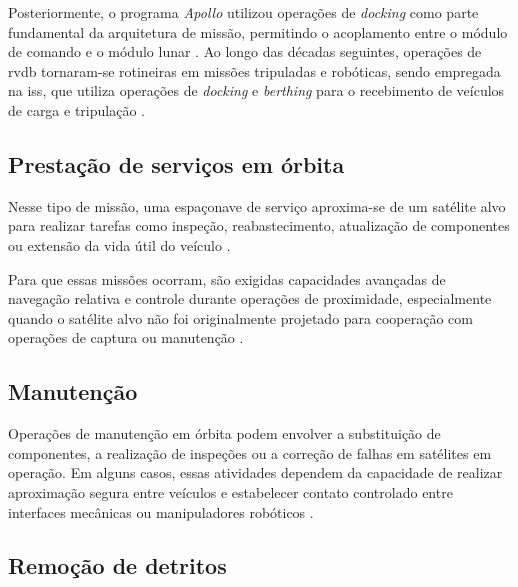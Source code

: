 Posteriormente, o programa \emph{Apollo} utilizou operações de \textit{docking} como parte fundamental da arquitetura de missão, permitindo o acoplamento entre o módulo de comando e o módulo lunar \cite{RVDBapollo,nevins1971}.
Ao longo das décadas seguintes, operações de \gls{rvdb} tornaram-se rotineiras em missões tripuladas e robóticas, sendo empregada na \gls{iss}, que utiliza operações de \textit{docking} e \textit{berthing} para o recebimento de veículos de carga e tripulação \cite{nasaRVDBiss,nasaVisitingVehicles}.

\subsection{Prestação de serviços em órbita}

Nesse tipo de missão, uma espaçonave de serviço aproxima-se de um satélite alvo para realizar tarefas como inspeção, reabastecimento, atualização de componentes ou extensão da vida útil do veículo \cite{mev_northrop}.

Para que essas missões ocorram, são exigidas capacidades avançadas de navegação relativa e controle durante operações de proximidade, especialmente quando o satélite alvo não foi originalmente projetado para cooperação com operações de captura ou manutenção \cite{arantes2011,flores2014review}.

\subsection{Manutenção}

Operações de manutenção em órbita podem envolver a substituição de componentes, a realização de inspeções ou a correção de falhas em satélites em operação.
Em alguns casos, essas atividades dependem da capacidade de realizar aproximação segura entre veículos e estabelecer contato controlado entre interfaces mecânicas ou manipuladores robóticos \cite{hubbleRVDB,flores2014review}.

\subsection{Remoção de detritos}


